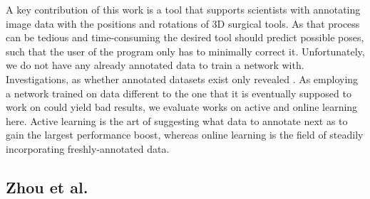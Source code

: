 A key contribution of this work is a tool that supports scientists with annotating image data with the positions and rotations of 3D surgical tools. As that process can be tedious and time-consuming the desired tool should predict possible poses, such that the user of the program only has to minimally correct it. Unfortunately, we do not have any already annotated data to train a network with. Investigations, as whether annotated datasets exist only revealed \cite{website}. As employing a network trained on data different to the one that it is eventually supposed to work on could yield bad results, we evaluate works on active and online learning here. Active learning is the art of suggesting what data to annotate next as to gain the largest performance boost, whereas online learning is the field of steadily incorporating freshly-annotated data.

\subsection{Zhou et al.}


